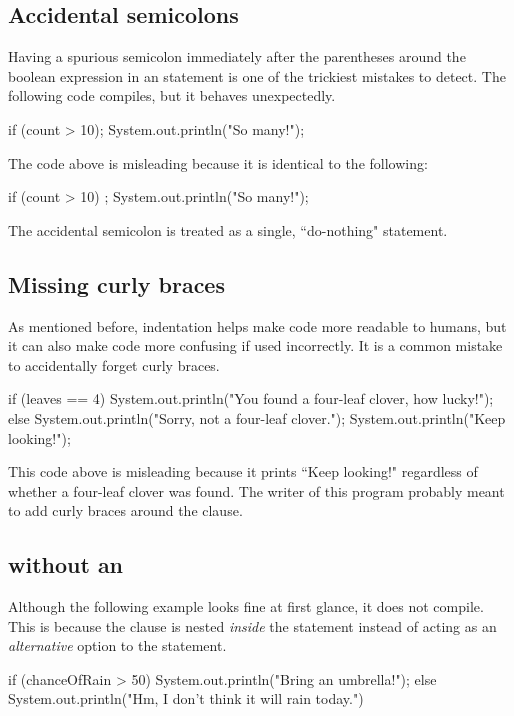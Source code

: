\subsection{Accidental semicolons}
Having a spurious semicolon immediately after the parentheses around the boolean expression in an  statement is one of the trickiest mistakes to detect. The following code compiles, but it behaves unexpectedly. 
\begin{code}
if (count > 10);
    System.out.println("So many!");
\end{code}

\noindent The code above is misleading because it is identical to the following:
\begin{code}
if (count > 10) {
    ;
}
System.out.println("So many!");
\end{code}

\noindent The accidental semicolon is treated as a single, ``do-nothing" statement.

\subsection{Missing curly braces}
As mentioned before, indentation helps make code more readable to humans, but it can also make code more confusing if used incorrectly. It is a common mistake to accidentally forget curly braces.

\begin{code}
if (leaves == 4) {
    System.out.println("You found a four-leaf clover, how lucky!");
} else
    System.out.println("Sorry, not a four-leaf clover.");
    System.out.println("Keep looking!");
\end{code}

\noindent This code above is misleading because it prints ``Keep looking!" regardless of whether a four-leaf clover was found. The writer of this program probably meant to add curly braces around the  clause.

\subsection{ without an }

Although the following example looks fine at first glance, it does not compile. This is because the  clause is nested \emph{inside} the  statement instead of acting as an \emph{alternative} option to the  statement.

\begin{code}
if (chanceOfRain > 50) {
    System.out.println("Bring an umbrella!");
    else {
        System.out.println("Hm, I don't think it will rain today.")
    }
}
\end{code}

